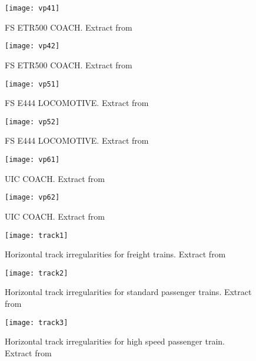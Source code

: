 \begin{appendices}
\begin{figure}[h]
    \centering
    \texttt{[image: vp41]}
    \caption{FS ETR500 COACH. Extract from \cite[Appendix 2]{d181dt329}}
\end{figure}

\begin{figure}[h]
    \centering
    \texttt{[image: vp42]}
    \caption{FS ETR500 COACH. Extract from \cite[Appendix 2]{d181dt329}}
\end{figure}

\begin{figure}[h]
    \centering
    \texttt{[image: vp51]}
    \caption{FS E444 LOCOMOTIVE. Extract from \cite[Appendix 2]{d181dt329}}
\end{figure}

\begin{figure}[h]
    \centering
    \texttt{[image: vp52]}
    \caption{FS E444 LOCOMOTIVE. Extract from \cite[Appendix 2]{d181dt329}}
\end{figure}

\begin{figure}[h]
    \centering
    \texttt{[image: vp61]}
    \caption{UIC COACH. Extract from \cite[Appendix 2]{d181dt329}}
\end{figure}

\begin{figure}[h]
    \centering
    \texttt{[image: vp62]}
    \caption{UIC COACH. Extract from \cite[Appendix 2]{d181dt329}}
\end{figure}

\begin{figure}[h]    \centering
    \texttt{[image: track1]}
    \caption{Horizontal track irregularities for freight trains. Extract from \cite[Figure 2.1]{d181}}
    \label{fig:track1}
\end{figure}

\begin{figure}[h]
    \centering
    \texttt{[image: track2]}
    \caption{Horizontal track irregularities for standard passenger trains. Extract from \cite[Figure 2.1]{d181}}
\end{figure}

\begin{figure}[h]
    \centering
    \texttt{[image: track3]}
    \caption{Horizontal track irregularities for high speed passenger train. Extract from \cite[Figure 2.1]{d181}}
    \label{fig:track3}
\end{figure}


\end{appendices}
